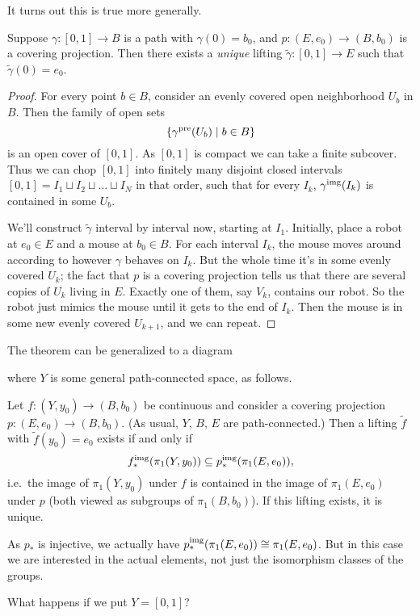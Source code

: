 It turns out this is true more generally.
\begin{theorem}
	Suppose $\gamma \colon [0,1] \to B$ is a path with $\gamma(0) = b_0$, and
	$ p \colon (E,e_0) \to (B,b_0) $
	is a covering projection.
	Then there exists a \emph{unique} lifting $\tilde\gamma \colon [0,1] \to E$
	such that $\tilde\gamma(0) = e_0$.
\end{theorem}
\begin{proof}
	For every point $b \in B$, consider an evenly covered
	open neighborhood $U_b$ in $B$.
	Then the family of open sets
	\[ \left\{ \gamma^{\text{pre}}(U_b) \mid b \in B \right\} \]
	is an open cover of $[0,1]$.
	As $[0,1]$ is compact we can take a finite subcover.
	Thus we can chop $[0,1]$ into finitely many disjoint closed intervals
	$[0,1] = I_1 \sqcup I_2 \sqcup \dots \sqcup I_N$ in that order,
	such that for every $I_k$, $\gamma^{\text{img}}(I_k)$ is contained
	in some $U_b$.

	We'll construct $\tilde\gamma$ interval by interval now,
	starting at $I_1$.
	Initially, place a robot at $e_0 \in E$ and a mouse at $b_0 \in B$.
	For each interval $I_k$, the mouse moves around according
	to however $\gamma$ behaves on $I_k$.
	But the whole time it's in some evenly covered $U_k$;
	the fact that $p$ is a covering projection tells us that
	there are several copies of $U_k$ living in $E$.
	Exactly one of them, say $V_k$, contains our robot.
	So the robot just mimics the mouse until it gets to the end of $I_k$.
	Then the mouse is in some new evenly covered $U_{k+1}$,
	and we can repeat.
\end{proof}

The theorem can be generalized to a diagram
\begin{center}
\end{center}
where $Y$ is some general path-connected space, as follows.
\begin{theorem}
	\label{thm:lifting}
	Let $f \colon (Y,y_0) \to (B, b_0)$ be continuous
	and consider a covering projection $p \colon (E, e_0) \to (B, b_0)$.
	(As usual, $Y$, $B$, $E$ are path-connected.)
	Then a lifting $\tilde f$ with $\tilde f(y_0) = e_0$ exists if and only if
	\[ f_\ast^{\text{img}}(\pi_1(Y, y_0)) \subseteq p_\ast^{\text{img}}(\pi_1(E, e_0)), \]
	i.e.\ the image of $\pi_1(Y, y_0)$ under $f$ is contained in
	the image of $\pi_1(E, e_0)$ under $p$ (both viewed as subgroups of $\pi_1(B, b_0)$).
	If this lifting exists, it is unique.
\end{theorem}
As $p_\ast$ is injective,
we actually have $p_\ast^{\text{img}}(\pi_1(E, e_0)) \cong \pi_1(E, e_0)$.
But in this case we are interested in the actual elements, not just the isomorphism classes of the groups.
\begin{ques}
	What happens if we put $Y= [0,1]$?
\end{ques}

